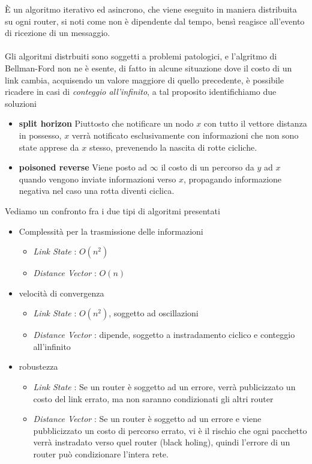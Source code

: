 \documentclass[12pt, letterpaper]{article}
\newcommand{\acc}{\\\hphantom{}\\}
\begin{document}
È un algoritmo iterativo ed asincrono, che viene eseguito in maniera distribuita su ogni router, si noti come non è dipendente 
dal tempo, bensì reagisce all'evento di ricezione di un messaggio.\acc 
Gli algoritmi distrbuiti sono soggetti a problemi patologici, e l'algritmo di Bellman-Ford non ne è esente, di fatto in alcune 
situazione dove il costo di un link cambia, acquisendo un valore maggiore di quello precedente, è possibile ricadere in casi 
di \textit{conteggio all'infinito}, a tal proposito identifichiamo due soluzioni\begin{itemize}
    \item \textbf{split horizon} Piuttosto che notificare un nodo $x$ con tutto il vettore distanza in possesso, $x$ verrà 
    notificato esclusivamente con informazioni che non sono state apprese da $x$ stesso, prevenendo la nascita di 
    rotte cicliche. 
    \item \textbf{poisoned reverse} Viene posto ad $\infty$ il costo di un percorso da $y$ ad $x$ quando vengono inviate 
    informazioni verso $x$, propagando informazione negativa nel caso una rotta diventi ciclica.
\end{itemize}
Vediamo un confronto fra i due tipi di algoritmi presentati\begin{itemize}
    \item Complessità per la trasmissione delle informazioni\begin{itemize}
        \item \textit{Link State} : $O(n^2)$
        \item \textit{Distance Vector} : $O(n)$ 
    \end{itemize}
    \item velocità di convergenza\begin{itemize}
        \item \textit{Link State} : $O(n^2)$, soggetto ad oscillazioni
        \item \textit{Distance Vector} : dipende, soggetto a instradamento ciclico e conteggio all'infinito
    \end{itemize}
    \item robustezza \begin{itemize}
        \item \textit{Link State} : Se un router è soggetto ad un errore, verrà publicizzato un costo del link errato, 
        ma non saranno condizionati gli altri router
        \item \textit{Distance Vector} : Se un router è soggetto ad un errore e viene pubblicizzato un costo di percorso 
        errato, vi è il rischio che ogni pacchetto verrà instradato verso quel router (black holing), quindi l'errore di un 
        router può condizionare l'intera rete.
    \end{itemize}
\end{itemize}
\end{document}

